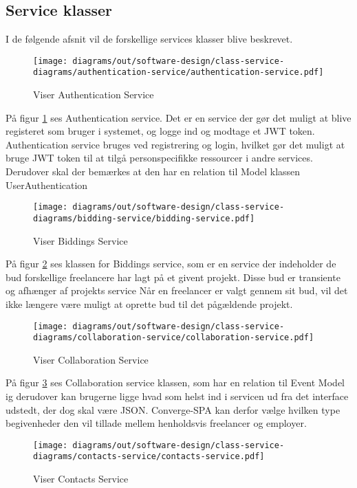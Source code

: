 \subsection{Service klasser}

I de følgende afsnit vil de forskellige services klasser blive beskrevet.

\begin{figure}[H]
    \centering
\texttt{[image: diagrams/out/software-design/class-service-diagrams/authentication-service/authentication-service.pdf]}
\caption{Viser Authentication Service}
\label{fig:authService}
\end{figure}

På figur \ref{fig:authService} ses Authentication service. Det er en service der gør det muligt at blive registeret som bruger i systemet, og logge ind og modtage et JWT token. Authentication service bruges ved registrering og login, hvilket gør det muligt at bruge JWT token til at tilgå personspecifikke ressourcer i andre services. Derudover skal der bemærkes at den har en relation til Model klassen UserAuthentication
\newpage
\begin{figure}[H]
    \centering
\texttt{[image: diagrams/out/software-design/class-service-diagrams/bidding-service/bidding-service.pdf]}
\caption{Viser Biddings Service}
\label{fig:biddingservice}
\end{figure}

På figur \ref{fig:biddingservice} ses klassen for Biddings service, som er en service der indeholder de bud forskellige freelancere har lagt på et givent projekt. Disse bud er transiente og afhænger af projekts service  Når en freelancer er valgt gennem sit bud, vil det ikke længere være muligt at oprette bud til det pågældende projekt.

\newpage
\begin{figure}[H]
    \centering
\texttt{[image: diagrams/out/software-design/class-service-diagrams/collaboration-service/collaboration-service.pdf]}
\caption{Viser Collaboration Service}
\label{fig:collaborationservice}
\end{figure}

På figur \ref{fig:collaborationservice} ses Collaboration service klassen, som har en relation til Event Model ig derudover kan brugerne ligge hvad som helst ind i servicen ud fra det interface udstedt, der dog skal være JSON. Converge-SPA kan derfor vælge hvilken type begivenheder den vil tillade mellem henholdsvis freelancer og employer. 
\newpage
\begin{figure}[H]
    \centering
\texttt{[image: diagrams/out/software-design/class-service-diagrams/contacts-service/contacts-service.pdf]}
\caption{Viser Contacts Service}
\label{fig:contactservice}
\end{figure}

